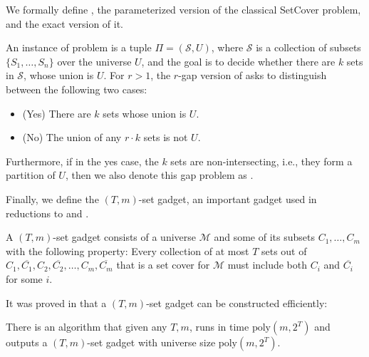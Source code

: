 We formally define \ksetcover{}, the parameterized version of the classical {\sc SetCover} problem, and the exact version of it. 
\begin{definition}[\ksetcover{}, \kexact{}]
    An instance of \ksetcover{} problem is a tuple $\Pi=(\mathcal S,U)$, where $\mathcal S$ is a collection of subsets $\{S_1,\ldots,S_n\}$ over the universe $U$, and the goal is to decide whether there are $k$ sets in $\mathcal S$, whose union is $U$. For $r>1$, the $r$-gap version of \ksetcover{} asks to distinguish between the following two cases:
    \begin{itemize}
        \item (Yes) There are $k$ sets whose union is $U$.
        \item (No) The union of any $r\cdot k$ sets is not $U$.
    \end{itemize}
    Furthermore, if in the yes case, the $k$ sets are non-intersecting, i.e., they form a partition of $U$, then we also denote this gap problem as \kexact{}.
\end{definition}

Finally, we define the $(T,m)$-set gadget, an important gadget used in reductions to \ksetcover{} and \kexact{}.

\begin{definition}
    A $(T,m)$-set gadget consists of a universe $\mathcal M$ and some of its subsets $C_1,\ldots,C_{m}$ with the following property: Every collection of at most $T$ sets out of $C_1,\overline {C_1},C_2,\overline{C_2},\ldots,C_m,\overline{C_m}$ that is a set cover for $\mathcal M$ must include both $C_i$ and $\overline{C_i}$ for some $i$.
\end{definition}

It was proved in \cite{LY94} that a $(T,m)$-set gadget can be constructed efficiently:

\begin{lemma}
\label{lem:construct-set-gadget}
    There is an algorithm that given any $T,m$, runs in time $\text{poly}(m,2^T)$ and outputs a $(T,m)$-set gadget with universe size $\text{poly}(m,2^T)$.
\end{lemma}


